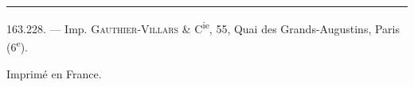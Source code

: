 \hrule
163.228. --- Imp. \textsc{Gauthier-Villars} \& C\textsuperscript{ie}, 55, Quai des Grands-Augustins, Paris (6\textsuperscript{e}).

\begin{center}Imprimé en France.\end{center}

